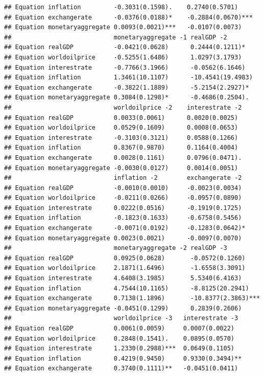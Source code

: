 \documentclass[11pt,preprint, authoryear]{elsarticle}
\numberwithin{equation}{section}
\numberwithin{figure}{section}
\numberwithin{table}{section}
\begin{document}
\begin{verbatim}
## Equation inflation         -0.3031(0.1598).    0.2740(0.5701)     
## Equation exchangerate      -0.0376(0.0188)*    -0.2884(0.0670)*** 
## Equation monetaryaggregate 0.0093(0.0021)***   -0.0107(0.0073)    
##                            monetaryaggregate -1 realGDP -2           
## Equation realGDP           -0.0421(0.0628)      0.2444(0.1211)*      
## Equation worldoilprice     -0.5255(1.6486)      1.0297(3.1793)       
## Equation interestrate      -0.7766(3.1966)      -0.0562(6.1646)      
## Equation inflation         1.3461(10.1107)      -10.4541(19.4983)    
## Equation exchangerate      -0.3822(1.1889)      -5.2154(2.2927)*     
## Equation monetaryaggregate 0.3084(0.1298)*      -0.4686(0.2504).     
##                            worldoilprice -2    interestrate -2   
## Equation realGDP           0.0033(0.0061)      0.0020(0.0025)    
## Equation worldoilprice     0.0529(0.1609)      0.0008(0.0653)    
## Equation interestrate      -0.3103(0.3121)     0.0588(0.1266)    
## Equation inflation         0.8367(0.9870)      0.1164(0.4004)    
## Equation exchangerate      0.0028(0.1161)      0.0796(0.0471).   
## Equation monetaryaggregate -0.0030(0.0127)     0.0014(0.0051)    
##                            inflation -2        exchangerate -2    
## Equation realGDP           -0.0010(0.0010)     -0.0023(0.0034)    
## Equation worldoilprice     -0.0211(0.0266)     -0.0957(0.0890)    
## Equation interestrate      0.0222(0.0516)      -0.1919(0.1725)    
## Equation inflation         -0.1823(0.1633)     -0.6758(0.5456)    
## Equation exchangerate      -0.0071(0.0192)     -0.1283(0.0642)*   
## Equation monetaryaggregate 0.0023(0.0021)      -0.0097(0.0070)    
##                            monetaryaggregate -2 realGDP -3          
## Equation realGDP           0.0925(0.0628)       -0.0572(0.1260)     
## Equation worldoilprice     2.1871(1.6496)       -1.6558(3.3091)     
## Equation interestrate      4.6408(3.1985)       5.5340(6.4163)      
## Equation inflation         4.7544(10.1165)      -8.8125(20.2941)    
## Equation exchangerate      0.7138(1.1896)       -10.8377(2.3863)*** 
## Equation monetaryaggregate -0.0451(0.1299)      0.2839(0.2606)      
##                            worldoilprice -3   interestrate -3    
## Equation realGDP           0.0061(0.0059)     0.0007(0.0022)     
## Equation worldoilprice     0.2848(0.1541).    0.0895(0.0570)     
## Equation interestrate      1.2330(0.2988)***  0.0649(0.1105)     
## Equation inflation         0.4219(0.9450)     0.9330(0.3494)**   
## Equation exchangerate      0.3740(0.1111)**   -0.0451(0.0411)    

\end{verbatim}
\end{document}
